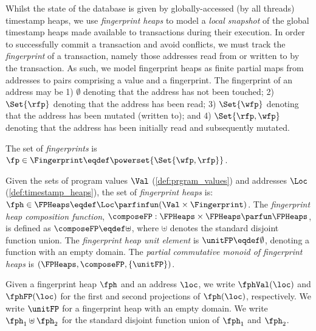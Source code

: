 Whilst the state of the database is given by globally-accessed (by all threads) timestamp heaps, we use \emph{fingerprint heaps} to model a \emph{local snapshot} of the global timestamp heaps made available to transactions during their execution. In order to successfully commit a transaction and avoid conflicts, we must track the \emph{fingerprint} of a transaction, namely those addresses read from or written to by the transaction. As such, we model fingerprint heaps as finite partial maps from addresses to pairs comprising a value and a fingerprint. The fingerprint of an address may be 1) $\emptyset$ denoting that the address has not been touched; 2) $\Set{\rfp}$ denoting that the address has been read; 3) $\Set{\wfp}$ denoting that the address has been mutated (written to); and 4) $\Set{\rfp, \wfp}$ denoting that the address has been initially read and subsequently mutated.   

\begin{definition}\label{def:fingerprint_heaps}
The set of \emph{fingerprints} is $\fp \in \Fingerprint \eqdef \powerset{\Set{\wfp,\rfp}}$.

\noindent Given the sets of program values $\Val$ (\ref{def:prgram_values}) and addresses $\Loc$ (\ref{def:timestamp_heaps}), the set of \emph{fingerprint heaps} is: $\fph \in \FPHeaps \eqdef \Loc \parfinfun (\Val \times \Fingerprint)$.
The \emph{fingerprint heap composition function}, $\composeFP: \FPHeaps \times \FPHeaps \parfun \FPHeaps$, is defined as $\composeFP \eqdef \uplus$, where $\uplus$ denotes the standard disjoint function union. The \emph{fingerprint heap unit element} is $\unitFP \eqdef \emptyset$, denoting a function with an empty domain.
The \emph{partial commutative monoid of fingerprint heaps} is $(\FPHeaps, \composeFP, \{\unitFP\})$.  
\end{definition}
%
Given a fingerprint heap $\fph$ and an address $\loc$, we write $\fphVal(\loc)$ and $\fphFP(\loc)$ for the first and second projections of $\fph(\loc)$, respectively. We write $\unitFP$ for a fingerprint heap with an empty domain. We write $\fph_1 \uplus \fph_2$ for the standard disjoint function union of $\fph_1$ and $\fph_2$. 

